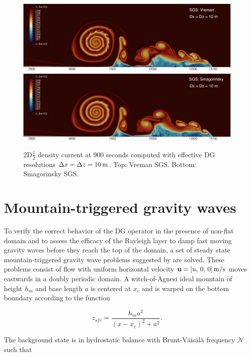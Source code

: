 \documentclass{report}
\begin{document}
\begin{figure}
    \centering
    \includegraphics[width=1\textwidth]{./figures/benchmarks/dc/DC_vreman_10m_paraview-notes.png}
    \includegraphics[width=1\textwidth]{./figures/benchmarks/dc/DC_smago_10m_paraview-notes.png}
     \caption{2D$\frac{1}{2}$ density current at 900 seconds computed with effective DG resolutions $\Delta x = \Delta z = 10\,{\rm m}$. Top: Vreman SGS. Bottom: Smagorinsky SGS.}
\label{fig:dc}
\end{figure}

\section{Mountain-triggered gravity waves}
To verify the correct behavior of the DG operator in the presence of non-flat domain and to assess the efficacy of the Rayleigh layer to damp fast moving gravity waves before they reach the top of the domain, a set of steady state mountain-triggered gravity wave problems suggested by \cite{smith1980} are solved. These problems consist of flow with uniform horizontal velocity ${\bf u}= [u,\,0,\, 0]\,{\rm m/s}$ moves eastwards in a doubly periodic domain. A witch-of-Agnesi ideal mountain of height $h_m$ and base length $a$ is centered at $x_c$ and is warped on the bottom boundary according to the function

\begin{equation}
    \label{eq:agnesi}
    z_{sfc} = \frac{h_m a^2}{(x - x_c)^2 + a^2}.
\end{equation}

The background state is in hydrostatic balance with Brunt-V\"ais\"al\"a frequency $\mathcal{N}$ such that
\end{document}
